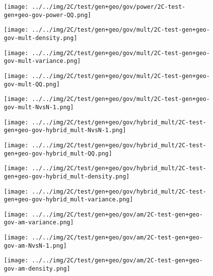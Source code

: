 \begin{figure}[H]
\centering	\texttt{[image: ../../img/2C/test/gen+geo/gov/power/2C-test-gen+geo-gov-power-QQ.png]}
\end{figure}
\begin{figure}[H]
\centering	\texttt{[image: ../../img/2C/test/gen+geo/gov/mult/2C-test-gen+geo-gov-mult-density.png]}
\end{figure}
\begin{figure}[H]
\centering	\texttt{[image: ../../img/2C/test/gen+geo/gov/mult/2C-test-gen+geo-gov-mult-variance.png]}
\end{figure}
\begin{figure}[H]
\centering	\texttt{[image: ../../img/2C/test/gen+geo/gov/mult/2C-test-gen+geo-gov-mult-QQ.png]}
\end{figure}
\begin{figure}[H]
\centering	\texttt{[image: ../../img/2C/test/gen+geo/gov/mult/2C-test-gen+geo-gov-mult-NvsN-1.png]}
\end{figure}
\begin{figure}[H]
\centering	\texttt{[image: ../../img/2C/test/gen+geo/gov/hybrid\_mult/2C-test-gen+geo-gov-hybrid\_mult-NvsN-1.png]}
\end{figure}
\begin{figure}[H]
\centering	\texttt{[image: ../../img/2C/test/gen+geo/gov/hybrid\_mult/2C-test-gen+geo-gov-hybrid\_mult-QQ.png]}
\end{figure}
\begin{figure}[H]
\centering	\texttt{[image: ../../img/2C/test/gen+geo/gov/hybrid\_mult/2C-test-gen+geo-gov-hybrid\_mult-density.png]}
\end{figure}
\begin{figure}[H]
\centering	\texttt{[image: ../../img/2C/test/gen+geo/gov/hybrid\_mult/2C-test-gen+geo-gov-hybrid\_mult-variance.png]}
\end{figure}
\begin{figure}[H]
\centering	\texttt{[image: ../../img/2C/test/gen+geo/gov/am/2C-test-gen+geo-gov-am-variance.png]}
\end{figure}
\begin{figure}[H]
\centering	\texttt{[image: ../../img/2C/test/gen+geo/gov/am/2C-test-gen+geo-gov-am-NvsN-1.png]}
\end{figure}
\begin{figure}[H]
\centering	\texttt{[image: ../../img/2C/test/gen+geo/gov/am/2C-test-gen+geo-gov-am-density.png]}
\end{figure}
